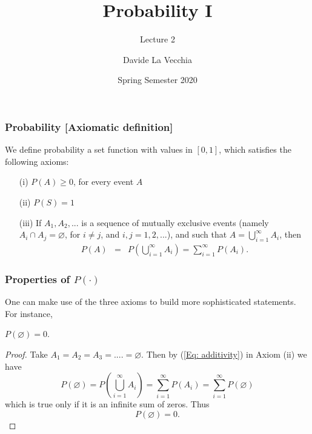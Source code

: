 \documentclass[notes=show,handout]{beamer}
\newcommand{\bea}{\begin{eqnarray}}
\newcommand{\eea}{\end{eqnarray}}
\begin{document}
\title[S110015]{Probability I}
\subtitle{Lecture 2}
\author[La Vecchia]{Davide La Vecchia}
\date{Spring Semester 2020}
\maketitle


\begin{frame}
\frametitle{Probability [Axiomatic definition]}

\begin{definition}
We define probability a set function with values in $[0,1]$, which
satisfies the following axioms:
\begin{itemize}
\item[ (i)] $P(A) \geq 0$, for every event $A$
\item[ (ii)] $P(S)=1$
\item[ (iii)] If $A_1,A_2,...$ is a sequence of mutually exclusive events (namely \color{red}$A_i \cap A_j =\varnothing$, for $i \neq j$, and $i,j=1,2,...$\color{black}),
and such that
$A = \bigcup_{i=1}^{\infty} A_i$, then
\bea
\label{Eq: additivity}
P(A) &=& P\left(  \bigcup_{i=1}^\infty A_i \right) = \sum_{i=1}^{\infty} P(A_i).
\eea
\end{itemize}
\end{definition}


\end{frame}

\begin{frame}
\frametitle{Properties of $P(\cdot)$}
One can make use of the three axioms to build more sophisticated statements. For instance,

\begin{theorem}
$P(\varnothing)=0$.
\end{theorem}
\vspace{0.3cm}
\begin{footnotesize}{ \begin{proof}
Take $A_1=A_2=A_3=....=\varnothing$. Then by (\ref{Eq: additivity}) in Axiom (ii) we have
$$
P(\varnothing)= P\left(  \bigcup_{i=1}^{\infty} A_i \right) = \sum_{i=1}^{\infty} P(A_i) =\sum_{i=1}^{\infty} P(\varnothing)
$$
which is true only if it is an infinite sum of zeros. Thus
$$
P(\varnothing) =  0.
$$
\end{proof} }\end{footnotesize}
\end{frame}
\end{document}
